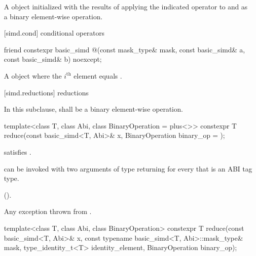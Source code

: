 \begin{itemdescr}
  \pnum\ConstraintOperatorTWellFormed

  \pnum\returns
  A  object initialized with the results of applying the indicated operator to  and  as a binary element-wise operation.
\end{itemdescr}

[simd.cond]{ conditional operators}

\begin{itemdecl}
friend constexpr basic_simd
@\simdselect@(const mask_type& mask, const basic_simd& a, const basic_simd& b) noexcept;
\end{itemdecl}

\begin{itemdescr}
  \pnum\returns
  A  object where the $i^\text{th}$ element equals  \foralli.
\end{itemdescr}

[simd.reductions]{ reductions}

\pnum
In this subclause,  shall be a binary element-wise operation.

\begin{itemdecl}
template<class T, class Abi, class BinaryOperation = plus<>>
  constexpr T reduce(const basic_simd<T, Abi>& x, BinaryOperation binary_op = {});
\end{itemdecl}

\begin{itemdescr}
  \pnum\constraints
   satisfies .

  \pnum\mandates
   can be invoked with two arguments of type
   returning  for every
   that is an ABI tag type.

  \pnum\returns
   \foralli ().

  \pnum\throws
  Any exception thrown from .
\end{itemdescr}

\begin{itemdecl}
template<class T, class Abi, class BinaryOperation>
  constexpr T reduce(const basic_simd<T, Abi>& x, const typename basic_simd<T, Abi>::mask_type& mask,
                     type_identity_t<T> identity_element, BinaryOperation binary_op);
\end{itemdecl}

